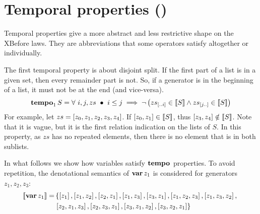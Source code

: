 \section{Temporal properties (\emph{\tempotext})}
\label{sec:temporal-properties}

Temporal properties give a more abstract and less restrictive shape on the \ac{XBefore} laws.
They are abbreviations that some operators satisfy altogether or individually.

The first temporal property is about disjoint split.
If the first part of a list is in a given set, then every remainder part is not.
So, if a generator is in the beginning of a list, it must not be at the end (and vice-versa).
%
\begin{equation}
\tempo[1]{S} = \forall~ i, j, zs ~\bullet~
i \le j \implies
\lnot \left(
\sliceright{zs}{i} \in \denote{S} \land \sliceleft{zs}{j} \in \denote{S}
\right)\label{def:tempo1}
\end{equation}
%
For example, let $zs = \listsin{z_0,z_1,z_2,z_3,z_4}$.
If $\listsin{z_0,z_1} \in \denote{S}$, thus $\listsin{z_3,z_4} \notin \denote{S}$.
Note that it is vague, but it is the first relation indication on the lists of $S$.
In this property, as $zs$ has no repeated elements, then there is no element that is in both sublists.

In what follows we show how variables satisfy $\tempo[]{}$ properties.
To avoid repetition, the denotational semantics of $\var{z_1}$ is considered for generators $z_1,z_2,z_3$:
%
\begin{align}
\denote{\var{z_1}} = & 
\left\{
\listsin{z_1}, 
\listsin{z_1,z_2},\listsin{z_2,z_1},
\listsin{z_1,z_3},\listsin{z_3,z_1},
\listsin{z_1,z_2,z_3},\listsin{z_1,z_3,z_2},
\right.
\nonumber\\
&
\left.
\listsin{z_2,z_1,z_3},\listsin{z_2,z_3,z_1},
\listsin{z_3,z_1,z_2},\listsin{z_3,z_2,z_1}
\right\}
\end{align}

